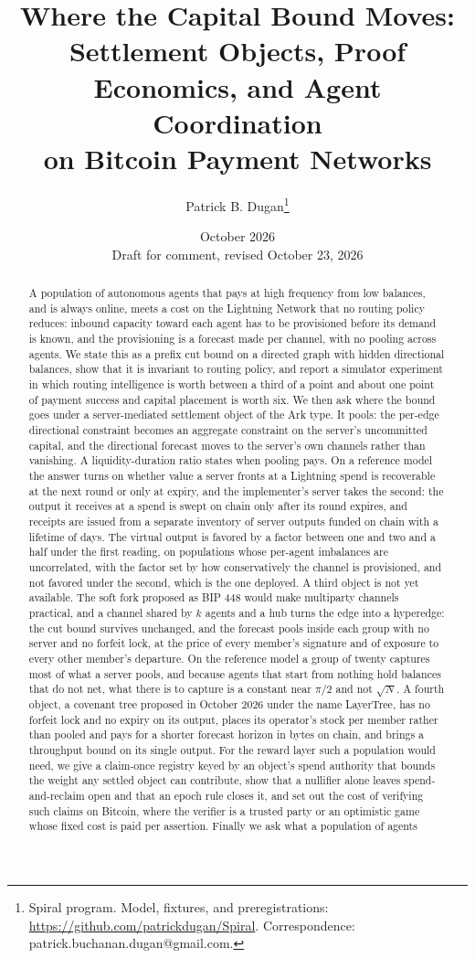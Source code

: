 \documentclass[11pt]{article}
\title{Where the Capital Bound Moves:\\[0.3em]
\large Settlement Objects, Proof Economics, and Agent Coordination\\ on Bitcoin Payment Networks}
\author{Patrick B. Dugan\thanks{Spiral program. Model, fixtures, and preregistrations: \url{https://github.com/patrickdugan/Spiral}. Correspondence: patrick.buchanan.dugan@gmail.com.}}
\date{October 2026\\ \small Draft for comment, revised October 23, 2026}
\theoremstyle{plain}
\theoremstyle{definition}
\theoremstyle{remark}
\begin{document}
\maketitle

\begin{abstract}
A population of autonomous agents that pays at high frequency from low balances, and is always online, meets a cost on the Lightning Network that no routing policy reduces: inbound capacity toward each agent has to be provisioned before its demand is known, and the provisioning is a forecast made per channel, with no pooling across agents. We state this as a prefix cut bound on a directed graph with hidden directional balances, show that it is invariant to routing policy, and report a simulator experiment in which routing intelligence is worth between a third of a point and about one point of payment success and capital placement is worth six. We then ask where the bound goes under a server-mediated settlement object of the Ark type. It pools: the per-edge directional constraint becomes an aggregate constraint on the server's uncommitted capital, and the directional forecast moves to the server's own channels rather than vanishing. A liquidity-duration ratio states when pooling pays. On a reference model the answer turns on whether value a server fronts at a Lightning spend is recoverable at the next round or only at expiry, and the implementer's server takes the second: the output it receives at a spend is swept on chain only after its round expires, and receipts are issued from a separate inventory of server outputs funded on chain with a lifetime of days. The virtual output is favored by a factor between one and two and a half under the first reading, on populations whose per-agent imbalances are uncorrelated, with the factor set by how conservatively the channel is provisioned, and not favored under the second, which is the one deployed. A third object is not yet available. The soft fork proposed as BIP 448 would make multiparty channels practical, and a channel shared by $k$ agents and a hub turns the edge into a hyperedge: the cut bound survives unchanged, and the forecast pools inside each group with no server and no forfeit lock, at the price of every member's signature and of exposure to every other member's departure. On the reference model a group of twenty captures most of what a server pools, and because agents that start from nothing hold balances that do not net, what there is to capture is a constant near $\pi/2$ and not $\sqrt N$. A fourth object, a covenant tree proposed in October 2026 under the name LayerTree, has no forfeit lock and no expiry on its output, places its operator's stock per member rather than pooled and pays for a shorter forecast horizon in bytes on chain, and brings a throughput bound on its single output. For the reward layer such a population would need, we give a claim-once registry keyed by an object's spend authority that bounds the weight any settled object can contribute, show that a nullifier alone leaves spend-and-reclaim open and that an epoch rule closes it, and set out the cost of verifying such claims on Bitcoin, where the verifier is a trusted party or an optimistic game whose fixed cost is paid per assertion. Finally we ask what a population of agents 
\end{abstract}
\end{document}

